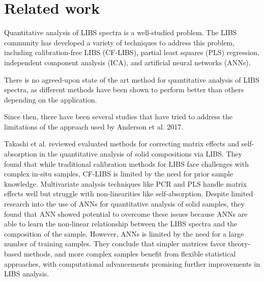\section{Related work}\label{sec:related_works}


Quantitative analysis of LIBS spectra is a well-studied problem.
The LIBS community has developed a variety of techniques to address this problem, including calibration-free LIBS (CF-LIBS), partial least squares (PLS) regression, independent component analysis (ICA), and artificial neural networks (ANNs).

There is no agreed-upon state of the art method for quantitative analysis of LIBS spectra, as different methods have been shown to perform better than others depending on the application.


Since then, there have been several studies that have tried to address the limitations of the approach used by Anderson et al. 2017.

Takashi et al. reviewed evaluated methods for correcting matrix effects and self-absorption in the quantitative analysis of solid compositions via LIBS.
They found that while traditional calibration methods for LIBS face challenges with complex in-situ samples, CF-LIBS is limited by the need for prior sample knowledge.
Multivariate analysis techniques like PCR and PLS handle matrix effects well but struggle with non-linearities like self-absorption.
Despite limited research into the use of ANNs for quantitative analysis of solid samples, they found that ANN showed potential to overcome these issues because ANNs are able to learn the non-linear relationship between the LIBS spectra and the composition of the sample.
However, ANNs is limited by the need for a large number of training samples.
They conclude that simpler matrices favor theory-based methods, and more complex samples benefit from flexible statistical approaches, with computational advancements promising further improvements in LIBS analysis.

